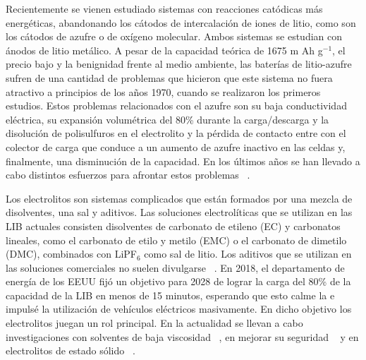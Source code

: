 Recientemente se vienen estudiado sistemas con reacciones catódicas más 
energéticas, abandonando los cátodos de intercalación de iones de litio, como son 
los cátodos de azufre o de oxígeno molecular. Ambos sistemas se estudian con 
ánodos de litio metálico. A pesar de la capacidad teórica de 1675 m Ah g$^{-1}$,
el precio bajo y la benignidad frente al medio ambiente, las baterías de 
litio-azufre sufren de una cantidad de problemas que hicieron que este sistema 
no fuera atractivo a principios de los años 1970, cuando se realizaron los 
primeros estudios. Estos problemas relacionados con el azufre son su baja
conductividad eléctrica, su expansión volumétrica del 80\% durante la 
carga/descarga y la disolución de polisulfuros en el electrolito y la pérdida de 
contacto entre con el colector de carga que conduce a un aumento de azufre 
inactivo en las celdas y, finalmente, una disminución de la capacidad. En los
últimos años se han llevado a cabo distintos esfuerzos para afrontar estos 
problemas ~\cite{zhao2020}.

Los electrolitos son sistemas complicados que están formados por una mezcla de 
disolventes, una sal y aditivos. Las soluciones electrolíticas que se utilizan en
las LIB actuales consisten disolventes de carbonato de etileno (EC) y carbonatos 
lineales, como el carbonato de etilo y metilo (EMC) o el carbonato de dimetilo 
(DMC), combinados con LiPF$_6$ como sal de litio. Los aditivos que se utilizan 
en las soluciones comerciales no suelen divulgarse ~\cite{schipper2016}. En 2018,
el departamento de energía de los EEUU fijó un objetivo para 2028 de lograr 
la carga del 80\% de la capacidad de la LIB en menos de 15 minutos, esperando que
esto calme la  e impulsé la utilización de 
vehículos eléctricos masivamente. En dicho objetivo los electrolitos juegan un 
rol principal. En la actualidad se llevan a cabo investigaciones con solventes de
baja viscosidad ~\cite{logan2020}, en mejorar su seguridad ~\cite{wang2019} 
y en electrolitos de estado sólido ~\cite{zheng2018}.

